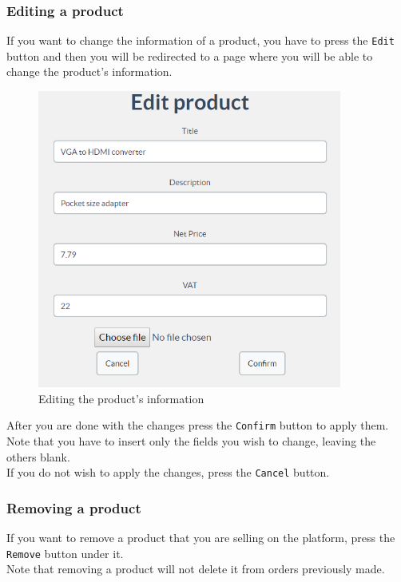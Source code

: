 		\subsubsection{Editing a product}
		If you want to change the information of a product, you have to press
		the \texttt{Edit} button and then you will be redirected to a 
		page where you will be able to change the product's information.
		\begin{figure}[H]
			\includegraphics[width=10cm]{res/images/edit_product.png}
			\centering
			\caption{Editing the product's information}
		\end{figure}
		\noindent After you are done with the changes press the \texttt{Confirm} 
		button to apply them.\\
		Note that you have to insert only the fields you wish to change, leaving
		 the others blank.
		\\If you do not wish to apply the changes, press the \texttt{Cancel} button.
		\subsubsection{Removing a product}
		If you want to remove a product that you are selling on the platform, press 
		the	\texttt{Remove} button under it.
		\\Note that removing a product will not delete it from orders previously made. 
